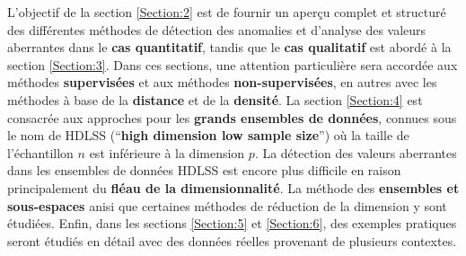 L'objectif de la section \ref{Section:2} est de fournir un aperçu complet et structuré des différentes méthodes de détection des anomalies et d'analyse des valeurs aberrantes dans le \textbf{cas quantitatif}, tandis que le \textbf{cas qualitatif} est abordé \`a la section \ref{Section:3}. Dans ces sections, une attention particulière sera accordée aux méthodes \textbf{supervisées} et aux méthodes \textbf{non-supervisées}, en autres avec les méthodes \`a base de la \textbf{distance} et de la \textbf{densité}. La section \ref{Section:4} est consacrée aux approches pour les \textbf{grands ensembles de données}, connues sous le nom de HDLSS (``\textbf{high dimension low sample size}'') où la taille de l'échantillon $n$ est inférieure à la dimension $p$. La détection des valeurs aberrantes dans les ensembles de données HDLSS est encore plus difficile en raison principalement du \textbf{fléau de la dimensionnalité}. La méthode des \textbf{ensembles et sous-espaces} anisi que certaines méthodes de réduction de la dimension y sont étudiées. Enfin, dans les sections \ref{Section:5} et \ref{Section:6}, des exemples pratiques seront étudiés en détail avec des données réelles provenant de plusieurs contextes.
\newpage